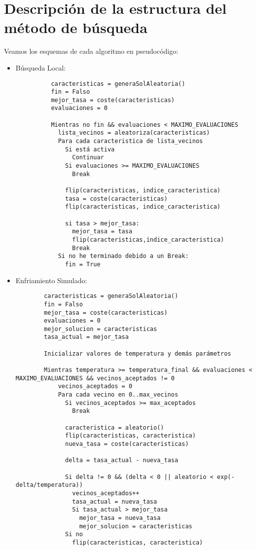 \documentclass[a4paper, 11pt]{article}
\begin{document}
  \section{Descripción de la estructura del método de búsqueda}
    Veamos los esquemas de cada algoritmo en pseudocódigo:
    \begin{itemize}
      \item Búsqueda Local:
        \begin{verbatim}
          caracteristicas = generaSolAleatoria()
          fin = Falso
          mejor_tasa = coste(caracteristicas)
          evaluaciones = 0

          Mientras no fin && evaluaciones < MAXIMO_EVALUACIONES
            lista_vecinos = aleatoriza(caracteristicas)
            Para cada caracteristica de lista_vecinos
              Si está activa
                Continuar
              Si evaluaciones >= MAXIMO_EVALUACIONES
                Break

              flip(caracteristicas, indice_caracteristica)
              tasa = coste(caracteristicas)
              flip(caracteristicas, indice_caracteristica)

              si tasa > mejor_tasa:
                mejor_tasa = tasa
                flip(caracteristicas,indice_caracteristica)
                Break
            Si no he terminado debido a un Break:
              fin = True
        \end{verbatim}
      \item Enfriamiento Simulado:
      \begin{verbatim}
        caracteristicas = generaSolAleatoria()
        fin = Falso
        mejor_tasa = coste(caracteristicas)
        evaluaciones = 0
        mejor_solucion = caracteristicas
        tasa_actual = mejor_tasa

        Inicializar valores de temperatura y demás parámetros

        Mientras temperatura >= temperatura_final && evaluaciones < MAXIMO_EVALUACIONES && vecinos_aceptados != 0
            vecinos_aceptados = 0
            Para cada vecino en 0..max_vecinos
              Si vecinos_aceptados >= max_aceptados
                Break

              caracteristica = aleatorio()
              flip(caracteristicas, caracteristica)
              nueva_tasa = coste(caracteristicas)

              delta = tasa_actual - nueva_tasa

              Si delta != 0 && (delta < 0 || aleatorio < exp(-delta/temperatura))
                vecinos_aceptados++
                tasa_actual = nueva_tasa
                Si tasa_actual > mejor_tasa
                  mejor_tasa = nueva_tasa
                  mejor_solucion = caracteristicas
              Si no
                flip(caracteristicas, caracteristica)


\end{verbatim}
\end{itemize}
\end{document}
